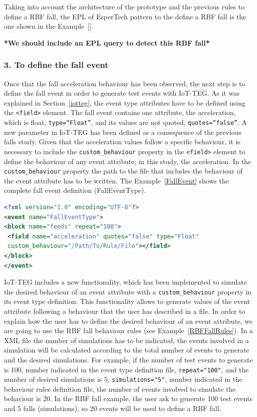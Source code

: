 \documentclass[conference]{IEEEtran}
\theoremstyle{definition}
\begin{document}
Taking into account the architecture of the prototype and the previous rules to define a RBF fall, the EPL of EsperTech
pattern to the define a RBF fall is the one shown in the Example~\ref{}.

\textbf{*We should include an EPL query to detect this RBF fall*}

\subsubsection*{3. To define the fall event} Once that the fall acceleration behaviour has been observed, the next step is to define the 
fall event in order to generate test events with IoT-TEG. As it was explained in Section~\ref{iotteg}, the event type attributes have
to be defined using the \texttt{<field>} element. The fall event contains one attribute, the acceleration, which is float, 
\texttt{type=``Float''}, and its values are not quoted, \texttt{quotes=``false''}. A new parameter in IoT-TEG has been defined as a 
consequence of the previous falls study. Given that the acceleration values follow a specific behaviour, it is necessary to include 
the \texttt{custom\_behaviour} property in the \texttt{<field>} element to define the behaviour of any event attribute; 
in this study, the acceleration. In the \texttt{custom\_behaviour} property the path to the file that includes the behaviour of the 
event attribute has to be written. The Example~\ref{FallEvent} shows the complete fall event definition (FallEventType).

\begin{lstlisting}[basicstyle=\ttfamily\footnotesize,language=XML,caption={Fall event type definition},label=FallEvent]
<?xml version="1.0" encoding="UTF-8"?>
<event name="FallEventType">
<block name="feeds" repeat="100">
 <field name="acceleration" quotes="false" type="Float" 
 custom_behaviour="/Path/To/Rule/File"></field>
</block>
</event>
\end{lstlisting}

IoT-TEG includes a new functionality, which has been implemented to simulate the desired behaviour of an 
event attribute with a \texttt{custom\_behaviour} property in its event type definition. This functionality 
allows to generate values of the event attribute following a behaviour that the user has described in a file.
In order to explain how the user has to define the desired behaviour of an event attribute, we are going
to use the RBF fall behaviour rules (see Example~\ref{RBFFallRules}). In a XML file the number of simulations has to be
indicated, the events involved in a simulation will be calculated according to the total number of events
to generate and the desired simulations. For example, if the number of test events to generate is 100, 
number indicated in the event type definition file, \texttt{repeat="100"}, and the number of desired 
simulations is 5, \texttt{simulations="5"}, number indicated in the behaviour rules definition file, 
the number of events involved to simulate the behaviour is 20. In the RBF fall example, the user ask to 
generate 100 test events and 5 falls (simulations), so 20 events will be used to define a RBF fall.
\end{document}
